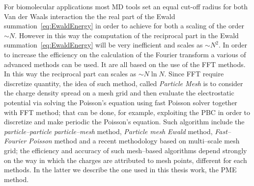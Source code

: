 For biomolecular applications most \ac{MD} tools set an equal cut-off radius for both Van der Waals interaction the the real part of the Ewald summation~\eqref{eq:EwaldEnergy} in order to achieve for both a scaling of the order $\sim N$. However in this way the computation of the reciprocal part in the Ewald summation~\eqref{eq:EwaldEnergy} will be very inefficient and scales as $\sim N^2$. In order to increase the efficiency on the calculation of the Fourier transform a various of advanced methods can be used. It are all based on the use of the \ac{FFT} methods. In this way the reciprocal part can scales as $\sim N\ln N$. Since \ac{FFT} require discretize quantity, the idea of such method, called \textit{Particle Mesh} is to consider the charge density spread on a mesh grid and then evaluate the electrostatic potential via solving the Poisson's equation using fast Poisson solver together with \ac{FFT} method; that can be done, for example, exploiting the \ac{PBC} in order to discretize and make periodic the Poisson's equation.
Such algorithm include the \textit{particle--particle particle--mesh} method, \textit{Particle mesh Ewald} method, \textit{Fast--Fourier Poisson} method and a recent methodology based on multi--scale mesh grid; the efficiency and accuracy of such mesh--based algorithms depend strongly on the way in which the charges are attributed to mesh points, different for each methods. In the latter we describe the one used in this thesis work, the \acf{PME} method.

